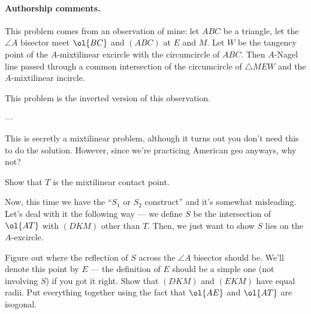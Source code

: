 \paragraph{Authorship comments.}
This problem comes from an observation of mine:
let $ABC$ be a triangle,
let the $\angle A$ bisector meet $\ol{BC}$ and $(ABC)$ at $E$ and $M$.
Let $W$ be the tangency point of the $A$-mixtilinear excircle
with the circumcircle of $ABC$.
Then $A$-Nagel line passed through a common intersection
of the circumcircle of $\triangle MEW$
and the $A$-mixtilinear incircle.

This problem is the inverted version of this observation.

---

This is secretly a mixtilinear problem,
although it turns out you don't need this to do the solution.
However, since we're practicing American geo anyways, why not?
\begin{walk}
  \ii Show that $T$ is the mixtilinear contact point.
\end{walk}
Now, this time we have the ``$S_1$ or $S_2$ construct''
and it's somewhat misleading.
Let's deal with it the following way --- we define
$S$ be the intersection of $\ol{AT}$ with $(DKM)$ other than $T$.
Then, we just want to show $S$ lies on the $A$-excircle.
\begin{walk}[resume]
  \ii Figure out where the reflection
  of $S$ across the $\angle A$ bisector should be.
  We'll denote this point by $E$ --- the definition of $E$
  should be a simple one (not involving $S$) if you got it right.
  \ii Show that $(DKM)$ and $(EKM)$ have equal radii.
  \ii Put everything together using the fact
  that $\ol{AE}$ and $\ol{AT}$ are isogonal.
\end{walk}
